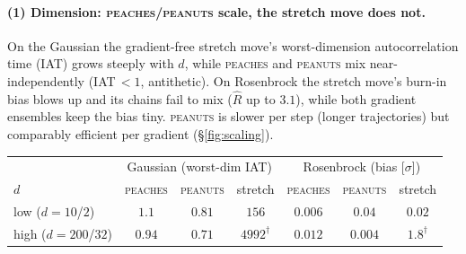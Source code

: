 \documentclass[11pt]{article}
\begin{document}
\paragraph{(1) Dimension: \textsc{peaches}/\textsc{peanuts} scale, the stretch move does not.}
On the Gaussian the gradient-free stretch move's worst-dimension
autocorrelation time (IAT) grows steeply with $d$, while \textsc{peaches} and
\textsc{peanuts} mix near-independently (IAT$\,<\!1$, antithetic). On
Rosenbrock the stretch move's burn-in bias blows up and its chains fail to
mix ($\hat R$ up to $3.1$), while both gradient ensembles keep the bias tiny.
\textsc{peanuts} is slower per step (longer trajectories) but comparably
efficient per gradient (\S\ref{fig:scaling}).
\begin{center}\small
\begin{tabular}{l ccc ccc}
\toprule
& \multicolumn{3}{c}{Gaussian (worst-dim IAT)} & \multicolumn{3}{c}{Rosenbrock (bias [$\sigma$])}\\
$d$ & \textsc{peaches} & \textsc{peanuts} & stretch & \textsc{peaches} & \textsc{peanuts} & stretch\\
\midrule
low  ($d{=}10$/$2$)   & $1.1$  & $0.81$ & $156$  & $0.006$ & $0.04$  & $0.02$\\
high ($d{=}200$/$32$) & $0.94$ & $0.71$ & $4992^{\dagger}$ & $0.012$ & $0.004$ & $1.8^{\dagger}$\\
\bottomrule
\end{tabular}
\end{center}
\end{document}
